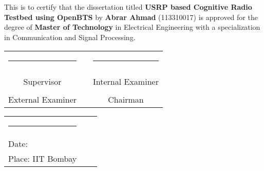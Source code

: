 \documentclass[12pt, a4paper, openright]{book}
\begin{document}
\chapter*{}
\thispagestyle{empty}

This is to certify that the dissertation titled \textbf{USRP based Cognitive
Radio Testbed using OpenBTS} by \textbf{Abrar Ahmad} (113310017) is approved
for the degree of \textbf{Master of Technology} in Electrical Engineering with
a specialization in Communication and Signal Processing.

\vspace{2.5cm}

\begin{center}
\begin{tabular}{ccc}
\rule{60mm}{0pt}        & \rule{10mm}{0pt}       & \rule{60mm}{0pt} \\
\dotfill                &                        & \dotfill \\
Supervisor              &                        & Internal Examiner \vspace{2cm} \\
\dotfill                &                        & \dotfill \\
External Examiner       &                        & Chairman \vspace{2cm} \\
\end{tabular}    
\end{center}

\vspace{5mm}
\begin{tabular}{lll}
\rule{40mm}{0pt}        & \rule{50mm}{0pt}       & \rule{60mm}{0pt} \\
Date:\dotfill           &                        & \\
Place: IIT Bombay       &                        & \\
\end{tabular}
\end{document}

